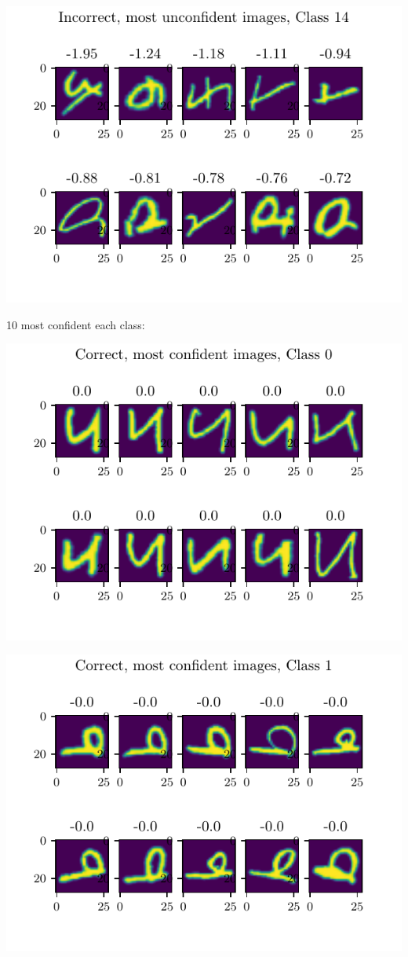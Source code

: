 \documentclass[11pt]{article}
\begin{document}
\includegraphics{figures/2d_unconfident_imgs_class_14.pdf}

10 most confident each class:

\includegraphics{figures/2d_confident_imgs_class_0.pdf}

\includegraphics{figures/2d_confident_imgs_class_1.pdf}
\end{document}
